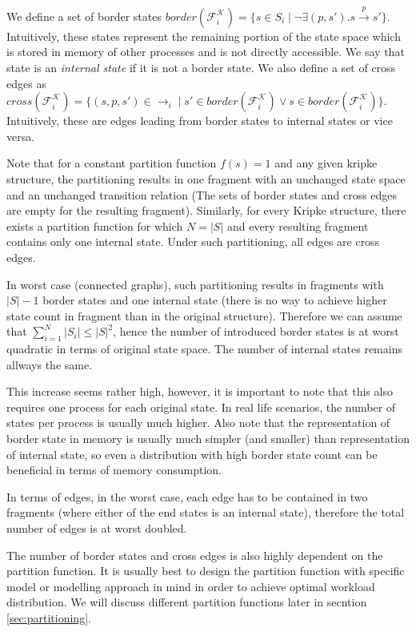 \documentclass[12pt,oneside, draft]{fithesis2}
\newcommand{\ks}[1][]{\ensuremath{\mathcal{K}_{#1}}}
\newcommand{\kf}[2]{\ensuremath{\mathcal{F}^{#2}_{#1}}}
\newcommand{\trans}[1]{\stackrel{#1}{\rightarrow}}
\begin{document}
			We define a set of border states $border(\kf{i}{\ks}) =  \{ s\in S_i \mid \neg \exists (p,s').s\trans{p}s'\}$. Intuitively, these states represent the remaining portion of the state space which is stored in memory of other processes and is not directly accessible. We say that state is an \emph{internal state} if it is not a border state. We also define a set of cross edges as $cross(\kf{i}{\ks}) = \{ (s, p, s') \in \trans{}_{i} \mid s' \in border(\kf{i}{\ks}) \vee s \in border(\kf{i}{\ks}) \}$. Intuitively, these are edges leading from border states to internal states or vice versa. 
			
			Note that for a constant partition function $f(s) = 1$ and any given kripke structure, the partitioning results in one fragment with an unchanged state space and an unchanged transition relation (The sets of border states and cross edges are empty for the resulting fragment). Similarly, for every Kripke structure, there exists a partition function for which $N = |S|$ and every resulting fragment contains only one internal state. Under such partitioning, all edges are cross edges. 
			
			In worst case (connected graphs), such partitioning results in fragments with $|S| - 1$ border states and one internal state (there is no way to achieve higher state count in fragment than in the original structure). Therefore we can assume that $\sum\limits_{i=1}^N | S_i | \leq |S|^2 $, hence the number of introduced border states is at worst quadratic in terms of original state space. The number of internal states remains allways the same.

			This increase seems rather high, however, it is important to note that this also requires one process for each original state. In real life scenarios, the number of states per process is usually much higher. Also note that the representation of border state in memory is usually much simpler (and smaller) than representation of internal state, so even a distribution with high border state count can be beneficial in terms of memory consumption. 
						
			In terms of edges, in the worst case, each edge has to be contained in two fragments (where either of the end states is an internal state), therefore the total number of edges is at worst doubled.			
			
			The number of border states and cross edges is also highly dependent on the partition function. It is usually best to design the partition function with specific model or modelling approach in mind in order to achieve optimal workload distribution. We will discuss different partition functions later in secntion \ref{sec:partitioning}. 
			
\end{document}

